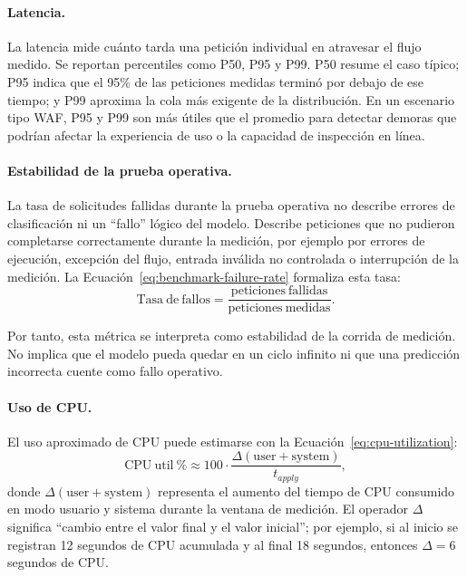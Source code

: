 \documentclass[12pt,oneside]{report}
\begin{document}
\paragraph{Latencia.}
La latencia mide cuánto tarda una petición individual en atravesar el flujo medido. Se reportan percentiles como P50, P95 y P99. P50 resume el caso típico; P95 indica que el 95\% de las peticiones medidas terminó por debajo de ese tiempo; y P99 aproxima la cola más exigente de la distribución. En un escenario tipo WAF, P95 y P99 son más útiles que el promedio para detectar demoras que podrían afectar la experiencia de uso o la capacidad de inspección en línea.

\paragraph{Estabilidad de la prueba operativa.}
La tasa de solicitudes fallidas durante la prueba operativa no describe errores de clasificación ni un ``fallo'' lógico del modelo. Describe peticiones que no pudieron completarse correctamente durante la medición, por ejemplo por errores de ejecución, excepción del flujo, entrada inválida no controlada o interrupción de la medición. La Ecuación~\eqref{eq:benchmark-failure-rate} formaliza esta tasa:
\begin{equation}
\label{eq:benchmark-failure-rate}
\mathrm{Tasa\ de\ fallos}=\frac{\mathrm{peticiones\ fallidas}}{\mathrm{peticiones\ medidas}}.
\end{equation}

Por tanto, esta métrica se interpreta como estabilidad de la corrida de medición. No implica que el modelo pueda quedar en un ciclo infinito ni que una predicción incorrecta cuente como fallo operativo.

\paragraph{Uso de CPU.}
El uso aproximado de CPU puede estimarse con la Ecuación~\eqref{eq:cpu-utilization}:
\begin{equation}
\label{eq:cpu-utilization}
\mathrm{CPU\ util\ \%}\approx 100\cdot \frac{\Delta(\mathrm{user}+\mathrm{system})}{t_{apply}},
\end{equation}
donde $\Delta(\mathrm{user}+\mathrm{system})$ representa el aumento del tiempo de CPU consumido en modo usuario y sistema durante la ventana de medición. El operador $\Delta$ significa ``cambio entre el valor final y el valor inicial''; por ejemplo, si al inicio se registran 12 segundos de CPU acumulada y al final 18 segundos, entonces $\Delta=6$ segundos de CPU.
\end{document}
